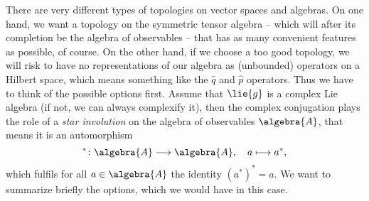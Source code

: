 There are very different types of topologies on vector spaces and algebras. On one 
hand, we want a topology on the symmetric tensor algebra -- which will 
after its completion be the algebra of observables -- that has as many 
convenient features as possible, of course. On the other hand, if we choose a too 
good topology, we will risk to have no representations of our algebra as 
(unbounded) operators on a Hilbert space, which means something like the $\hat 
q$ and $\hat p$ operators. Thus we have to think of the possible options first. 
Assume that $\lie{g}$ is a complex Lie algebra (if not, we can always complexify 
it), then the complex conjugation plays the role of a \emph{star involution} on 
the algebra of observables $\algebra{A}$, that means it is an automorphism
\begin{equation*}
	^* \colon
	\algebra{A}
	\longrightarrow
	\algebra{A}
	, \quad
	a 
	\longmapsto 
	a^*,
\end{equation*}
which fulfils for all $a \in \algebra{A}$ the identity $(a^*)^* = a$. We want to 
summarize briefly the options, which we would have in this case.
